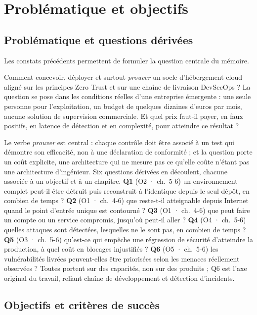 \section{Problématique et objectifs}
\label{sec:problematique-objectifs}

\subsection{Problématique et questions dérivées}
\label{subsec:problematique}

Les constats précédents permettent de formuler la question centrale du mémoire.
\begin{keybox}
Comment concevoir, déployer et surtout \emph{prouver} un socle d'hébergement cloud aligné sur
les principes Zero Trust et sur une chaîne de livraison DevSecOps ? La question se pose dans
les conditions réelles d'une entreprise émergente : une seule personne pour l'exploitation,
un budget de quelques dizaines d'euros par mois, aucune solution de supervision commerciale.
Et quel prix faut-il payer, en faux positifs, en latence de détection et en complexité, pour
atteindre ce résultat ?
\end{keybox}

Le verbe \emph{prouver} est central : chaque contrôle doit être associé à un test qui démontre
son efficacité, non à une déclaration de conformité ; et la question porte un coût explicite, une
architecture qui ne mesure pas ce qu'elle coûte n'étant pas une architecture d'ingénieur. Six
questions dérivées en découlent, chacune associée à un objectif et à un chapitre. \textbf{Q1} (O2 · ch.~5-6) un environnement complet peut-il être
détruit puis reconstruit à l'identique depuis le seul dépôt, en combien de temps ? \textbf{Q2}
(O1 · ch.~4-6) que reste-t-il atteignable depuis Internet quand le point d'entrée unique est
contourné ? \textbf{Q3} (O1 · ch.~4-6) que peut faire un compte ou un service compromis,
jusqu'où peut-il aller ? \textbf{Q4} (O4 · ch.~5-6) quelles attaques sont détectées, lesquelles
ne le sont pas, en combien de temps ? \textbf{Q5} (O3 · ch.~5-6) qu'est-ce qui empêche une
régression de sécurité d'atteindre la production, à quel coût en blocages injustifiés ?
\textbf{Q6} (O5 · ch.~5-6) les vulnérabilités livrées peuvent-elles être priorisées selon les
menaces réellement observées ? Toutes portent sur des capacités, non sur des produits ; Q6 est
l'axe original du travail, reliant chaîne de développement et détection d'incidents.

\subsection{Objectifs et critères de succès}
\label{subsec:objectifs}

